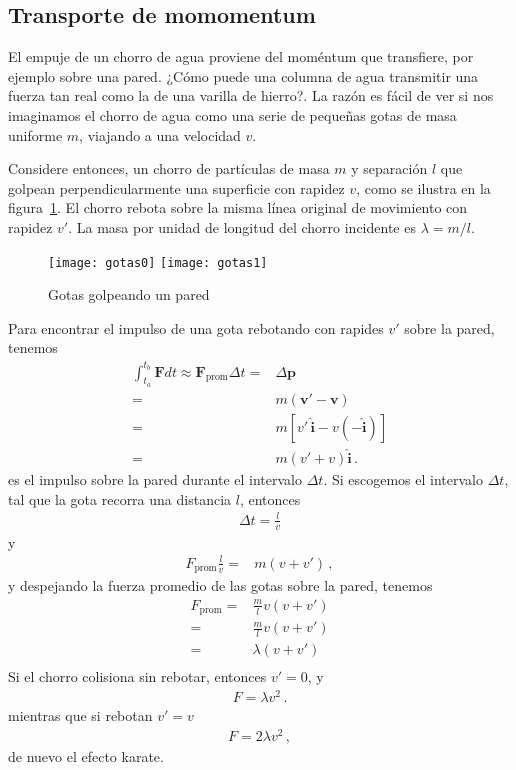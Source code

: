 \subsection{Transporte de momomentum}

El empuje de un chorro de agua proviene del moméntum que transfiere, por ejemplo sobre una pared. ¿Cómo puede una columna de agua transmitir una fuerza tan real como la de una varilla de hierro?. La razón es fácil de ver si nos imaginamos el chorro de agua como una serie de pequeñas gotas de masa uniforme $m$, viajando a una velocidad $v$.  

Considere entonces, un chorro de partículas de masa $m$ y separación
$l$ que golpean perpendicularmente una superficie con rapidez $v$,
como se ilustra en la figura~\ref{fig:gotas}. El chorro rebota sobre
la misma línea original de movimiento con rapidez $v'$. La masa por
unidad de longitud del chorro incidente es $\lambda=m/l$.

\begin{frame}
 \begin{figure}
  \centering
{\texttt{[image: gotas0]}}
{\texttt{[image: gotas1]}}
  \caption{Gotas golpeando un pared}
  \label{fig:gotas}
\end{figure}
\end{frame}
Para encontrar el impulso de una gota rebotando con rapides $v'$ sobre la pared, tenemos
\begin{align*}
  \int_{t_a}^{t_b} \mathbf{F} dt\approx \mathbf{F}_{\text{prom}}\Delta t=&\Delta \mathbf{p}\nonumber\\
=&m (\mathbf{v}'-\mathbf{v})\nonumber\\
=&m[v'\,\hat{\mathbf{i}}-v(-\hat{\mathbf{i}})]\nonumber\\
=&m(v'+v)\hat{\mathbf{i}}\,.
\end{align*}
es el impulso sobre la pared durante el intervalo $\Delta t$. Si escogemos el intervalo $\Delta t$, tal que la gota recorra una distancia $l$, entonces
\begin{align*}
  \Delta t=\frac{l}{v}
\end{align*}
y
\begin{align*}
  F_{\text{prom}}\frac{l}{v}=&m(v+v')\,,
\end{align*}
y despejando la fuerza promedio de las gotas sobre la pared, tenemos
\begin{align*}
    F_{\text{prom}}=&\frac{m}{l}v(v+v')\nonumber\\
  =&\frac{m}{l}v(v+v')\nonumber\\
  =&\lambda(v+v')\nonumber\\
\end{align*}
Si el chorro colisiona sin rebotar, entonces $v'=0$, y
\begin{align*}
F=\lambda v^2\,.  
\end{align*}
mientras que si rebotan $v'=v$
\begin{align*}
  F=2\lambda v^2\,,
\end{align*}
de nuevo el efecto karate.

